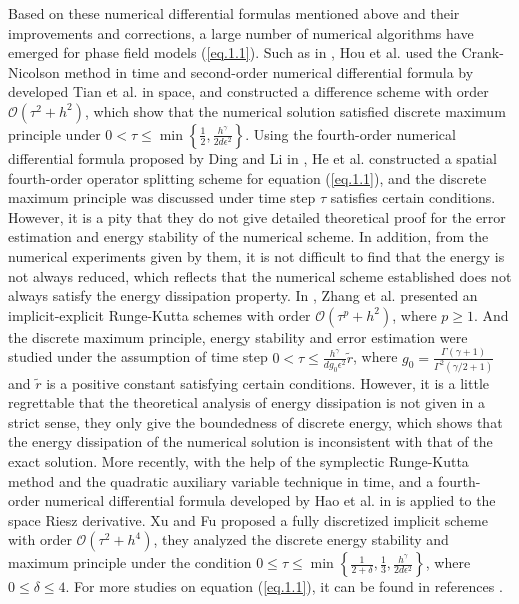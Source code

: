 \documentclass{siamart171218}
\numberwithin{theorem}{section}
\numberwithin{equation}{section}
\begin{document}
Based on these numerical differential formulas mentioned
 above and their improvements and corrections, a
 large number of numerical algorithms have emerged
  for phase field models (\ref{eq.1.1}). Such as in \cite{Hou2017},
Hou et al. used the Crank-Nicolson method in time and second-order
numerical differential formula by developed Tian et al.
\cite{Tian2015} in space,
and constructed a difference scheme with order
$\mathcal{O}\left(\tau^2+h^2\right)$, which show that
the numerical solution satisfied discrete maximum principle under
$0<\tau\leq\min \left\{\frac{1}{2},\frac{h^\gamma}{2d\epsilon^2}\right\}$.
Using the fourth-order numerical differential formula proposed by
Ding and Li in \cite{Ding2015},
He et al. \cite{He2020} constructed
a spatial fourth-order operator splitting
scheme for equation (\ref{eq.1.1}),
and the discrete maximum principle was discussed
under time step $\tau$ satisfies
certain conditions.
However, it is a pity that they do not give detailed theoretical proof for the
error estimation and energy stability of the numerical scheme.
In addition, from the numerical experiments given by them,
it is not difficult to find that the energy is not always reduced, which reflects
 that the numerical scheme established does
 not always satisfy the energy dissipation property.
In \cite{Zhang2021}, Zhang
et al. presented an implicit-explicit Runge-Kutta schemes with order
$\mathcal{O}\left(\tau^p+h^2\right)$, where $p\geq1$.
And the discrete maximum principle,
energy stability and error estimation were studied
under the assumption of time step $0<\tau\leq\frac{h^\gamma}{dg_0\epsilon^2}\tilde{r}$,
 where $g_0=\frac{\Gamma(\gamma+1)}{\Gamma^2(\gamma/2+1)}$ and $\tilde{r}$ is a positive
  constant satisfying certain conditions. However, it is a little regrettable that the theoretical
   analysis of energy dissipation is not given in a strict sense, they only give
   the boundedness of discrete energy, which shows that the energy
   dissipation of the numerical solution is inconsistent with that of the exact solution.
More recently, with the help of
the symplectic Runge-Kutta method and the quadratic
auxiliary variable technique \cite{Gong2022} in time, and
a fourth-order numerical differential formula developed by Hao et al. in \cite{Hao2021}
 is applied to the space Riesz derivative.
Xu and Fu \cite{Xu2024} proposed a fully discretized implicit scheme with order
$\mathcal{O}\left(\tau^2+h^4\right)$,  they analyzed the discrete energy stability and
maximum principle under the condition
$0\leq\tau\leq\min\left\{\frac{1}{2+\delta},\frac{1}{3},\frac{h^\gamma}{2d\epsilon^2}\right\}$,
where $0\leq\delta\leq4$. For more studies on equation (\ref{eq.1.1}),
it can be found in references \cite{Bu2019,Chen12021,Chen22021}.
\end{document}
